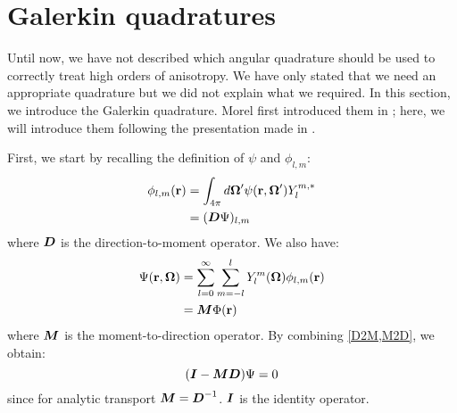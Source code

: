 \section{Galerkin quadratures}
Until now, we have not described which angular quadrature should be used to
correctly treat high orders of anisotropy. We have only
stated that we need an appropriate quadrature but we did not explain what we
required. In this section, we introduce the Galerkin quadrature. Morel
first introduced them in \cite{galerkin_morel}; here, we
will introduce them following the presentation made in \cite{pautz_fp}. 

First, we start by recalling the definition of $\psi$ and $\phi_{l,m}$:
\begin{equation}
  \begin{split}
    \phi_{l,m}(\br) &= \int_{4\pi} d\bo' \psi(\br,\bo') Y_l^{m,*}\\
                    &=(\bs{D} \Psi)_{l,m}
  \end{split}
  \label{D2M}
\end{equation}
where $\boldsymbol{D}$ is the direction-to-moment operator. We also have:
\begin{equation}
  \begin{split}
    \Psi(\br,\bo) &= \sum_{l=0}^{\infty} \sum_{m=-l}^l Y_l^m(\bo)\phi_{l,m}(\br)\\
                  &= \bs{M}\Phi(\br)
  \end{split}
  \label{M2D}
\end{equation}
where $\boldsymbol{M}$ is the moment-to-direction operator. By combining \cref{D2M,M2D}, 
we obtain:
\begin{equation}
  (\bs{I}-\bs{MD})\Psi = 0
  \label{identity_alpha}
\end{equation}
since for analytic transport $\boldsymbol{M}=\boldsymbol{D}^{-1}$. $\boldsymbol{I}$ is the identity operator.


